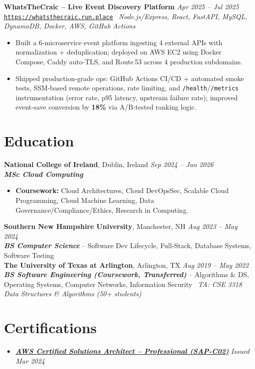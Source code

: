 \documentclass[10pt,a4paper]{article}
\newcommand{\projectentryurl}[5]{%
  \Needspace{3\baselineskip}%
  \textbf{#1} \hfill \textit{#2}\\[-0.15em]
  {\small\href{#3}{\texttt{#4}}} \textbar\ \textit{#5}\\[-0.25em]
}
\begin{document}
\vspace{0.10em}
\projectentryurl{WhatsTheCraic -- Live Event Discovery Platform}{Apr 2025 -- Jul 2025}{https://github.com/UT07/whatsthecraic}{https://whatsthecraic.run.place}{Node.js/Express, React, FastAPI, MySQL, DynamoDB, Docker, AWS, GitHub Actions}
\begin{itemize}
  \item Built a 6-microservice event platform ingesting 4 external APIs with normalization + deduplication; deployed on AWS EC2 using Docker Compose, Caddy auto-TLS, and Route\,53 across 4 production subdomains.
  \item Shipped production-grade ops: GitHub Actions CI/CD + automated smoke tests, SSM-based remote operations, rate limiting, and \texttt{/health}/\texttt{/metrics} instrumentation (error rate, p95 latency, upstream failure rate); improved event-save conversion by \textbf{18\%} via A/B-tested ranking logic.
\end{itemize}

\section*{Education}
\textbf{National College of Ireland}, Dublin, Ireland \hfill \textit{Sep 2024 -- Jan 2026}\\[-0.15em]
\textbf{\textit{MSc Cloud Computing}}\\[-0.25em]
\begin{itemize}
  \item \textbf{Coursework:} Cloud Architectures, Cloud DevOpsSec, Scalable Cloud Programming, Cloud Machine Learning, Data Governance/Compliance/Ethics, Research in Computing.
\end{itemize} 

\vspace{0.12em}
\textbf{Southern New Hampshire University}, Manchester, NH \hfill \textit{Aug 2023 -- May 2024}\\[-0.15em]
\textbf{\textit{BS Computer Science}} -- Software Dev Lifecycle, Full-Stack, Database Systems, Software Testing\\[0.05em]

\textbf{The University of Texas at Arlington}, Arlington, TX \hfill \textit{Aug 2019 -- May 2022}\\[-0.15em]
\textbf{\textit{BS Software Engineering (Coursework, Transferred)}} -- Algorithms \& DS, Operating Systems, Computer Networks, Information Security \textbar\ \textit{TA: CSE 3318 Data Structures \& Algorithms (50+ students)}

\section*{Certifications}
\begin{itemize}
  \item \href{https://www.credly.com/badges/6e22a6c0-9922-49d5-b59f-34cc593c82c3/public_url}{\textbf{\textit{AWS Certified Solutions Architect -- Professional (SAP-C02)}}} \hfill \textit{Issued Mar 2024}
\end{itemize}
\end{document}
